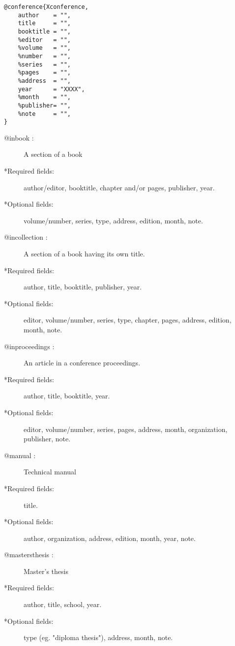 \begin{lstlisting}
@conference{Xconference,
    author    = "",
    title     = "",
    booktitle = "",
    %editor   = "",
    %volume   = "",
    %number   = "",
    %series   = "",
    %pages    = "",
    %address  = "",
    year      = "XXXX",
    %month    = "",
    %publisher= "",
    %note     = "",
}
\end{lstlisting}
\begin{description}
\item[@inbook :] A section of a book
\item[*Required fields:] author/editor, booktitle, chapter and/or pages, publisher, year.
\item[*Optional fields:] volume/number, series, type, address, edition, month, note.
\item[@incollection :] A section of a book having its own title.
\item[*Required fields:] author, title, booktitle, publisher, year.
\item[*Optional fields:] editor, volume/number, series, type, chapter, pages, address, edition, month, note.
\item[@inproceedings :] An article in a conference proceedings.
\item[*Required fields:] author, title, booktitle, year.
\item[*Optional fields:] editor, volume/number, series, pages, address, month, organization, publisher, note.
\item[@manual :] Technical manual
\item[*Required fields:] title.
\item[*Optional fields:] author, organization, address, edition, month, year, note.
\item[@mastersthesis :] Master's thesis
\item[*Required fields:] author, title, school, year.
\item[*Optional fields:] type (eg. "diploma thesis"), address, month, note.
\end{description}

